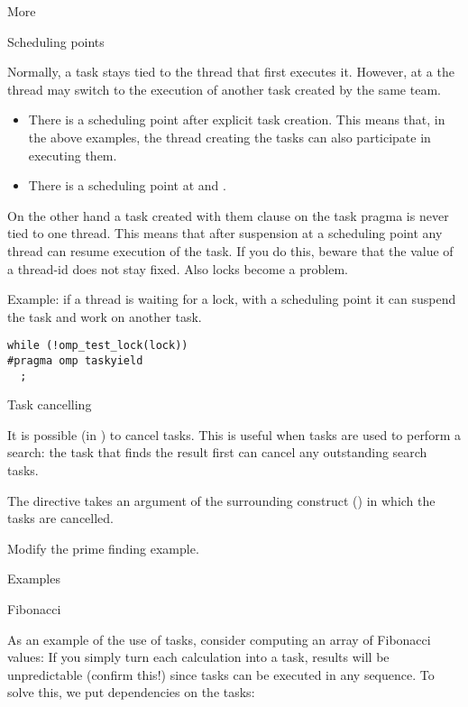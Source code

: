  {More}

 {Scheduling points}

Normally, a task stays tied to the thread that first executes it.
However, at a  the thread may
switch to the execution of another task created by the same team.
\begin{itemize}
\item There is a scheduling point after explicit task creation. This
  means that, in the above examples, the thread creating the tasks can
  also participate in executing them.
\item There is a scheduling point at  and .
\end{itemize}

On the other hand a task created with them  clause
on the task pragma is never tied to one thread. This means that after
suspension at a scheduling point any thread can resume execution of
the task.
If you do this, beware
that the value of a thread-id does not stay fixed. Also locks become a problem.

Example: if a thread is waiting for a lock, with a scheduling point it
can suspend the task and work on another task.
\begin{verbatim}
while (!omp_test_lock(lock))
#pragma omp taskyield
  ;
\end{verbatim}

 {Task cancelling}

It is possible (in ) to cancel
tasks. This is useful when tasks are used to perform a search: the
task that finds the result first can cancel any outstanding search
tasks.

The directive  takes an argument of the
surrounding construct () in
which the tasks are cancelled.

\begin{exercise}
  Modify the prime finding example.
\end{exercise}

 {Examples}

 {Fibonacci}

As an example of the use of tasks, consider computing an array of Fibonacci values:
%
%
If you simply turn each calculation into a task, results will be
unpredictable (confirm this!) since tasks can be executed in any sequence.
To solve this, we put dependencies on the tasks:
%

